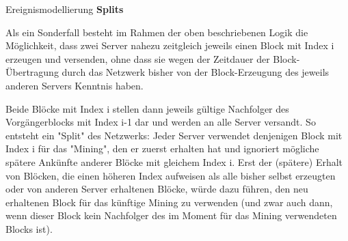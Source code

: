 \documentclass{article}
\begin{document}
\begin{exercise}{Ereignismodellierung}
  \textbf{Splits}

  Als ein Sonderfall besteht im Rahmen der oben beschriebenen Logik die Möglichkeit, dass zwei Server nahezu zeitgleich jeweils einen Block mit Index i erzeugen und versenden, ohne dass sie wegen der Zeitdauer der Block-Übertragung durch das Netzwerk bisher von der Block-Erzeugung des jeweils anderen Servers Kenntnis haben.
  \par Beide Blöcke mit Index i stellen dann jeweils gültige Nachfolger des Vorgängerblocks mit Index i-1 dar und werden an alle Server versandt. So entsteht ein "Split" des Netzwerks: Jeder Server verwendet denjenigen Block mit Index i für das "Mining", den er zuerst erhalten hat und ignoriert mögliche spätere Ankünfte anderer Blöcke mit gleichem Index i. Erst der (spätere) Erhalt von Blöcken, die einen höheren Index aufweisen als alle bisher selbst erzeugten oder von anderen Server erhaltenen Blöcke, würde dazu führen, den neu erhaltenen Block für das künftige Mining zu verwenden (und zwar auch dann, wenn dieser Block kein Nachfolger des im Moment für das Mining verwendeten Blocks ist).


\end{exercise}
\end{document}
